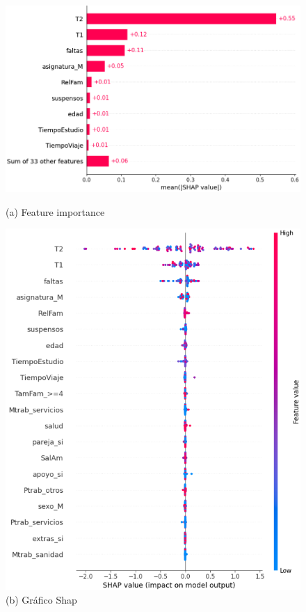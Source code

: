 \documentclass{article}
\begin{document}
\begin{figure}[h!]
  \centering
  \begin{minipage}[b]{0.45\textwidth}
      \centering
      \includegraphics[scale=0.35]{Shap1_M1.png}
      \caption{(a) Feature importance}
  \end{minipage}
  \hfill
  \begin{minipage}[b]{0.45\textwidth}
      \centering
      \includegraphics[scale=0.27]{Shap2_M1.png}
      \caption{(b) Gráfico Shap}
  \end{minipage}
\end{figure}
\end{document}
